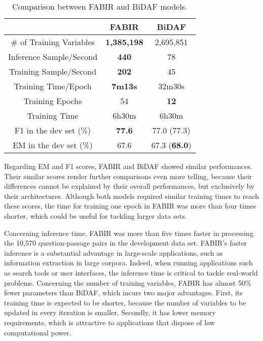 \documentclass[conference, letterpaper, 10pt]{IEEEtran}
\newcommand\Tstrut{\rule{0pt}{2.6ex}}
\begin{document}
\begin{table}[h!]
    \centering
    \caption{Comparison between FABIR and BiDAF \cite{Seo2016} models. }
    \begin{tabular}{| c || c |c|}
        \hline\Tstrut
         & \textbf{FABIR} &\textbf{BiDAF} \\ [0.5ex] 
        \hline
        \hline\Tstrut
         \# of Training Variables & \textbf{1,385,198} & 2,695,851\\
Inference Sample/Second & \textbf{440} & 78 \\
         Training Sample/Second &\textbf{202} & 45 \\
         Training Time/Epoch &\textbf{7m13s} & 32m30s \\
         Training Epochs & 54  & \textbf{12} \\
         Training Time & 6h30m  & 6h30m \\
         F1 in the dev set (\%) & \textbf{77.6} & 77.0 (77.3)\\
         EM in the dev set (\%) & 67.6 &67.3 (\textbf{68.0})\\\hline 
    \end{tabular}
    \label{tab:BidafvsFabir}
\end{table}

Regarding EM and F1 scores, FABIR and BiDAF showed similar performances. 
Their similar scores render further comparisons even more telling, because their differences cannot be explained by their overall performances, but exclusively by their architectures.
Although both models required similar training times to reach these scores, the time for training one epoch in FABIR was more than four times shorter, which could be useful for tackling larger data sets. 

Concerning inference time, FABIR was more than five times faster in processing the 10,570 question-passage pairs in the development data set. 
FABIR's faster inference is a substantial advantage in large-scale applications, such as information extraction in large corpora.
Indeed, when running applications such as search tools or user interfaces, the inference time is critical to tackle real-world problems. 
Concerning the number of training variables, FABIR has almost 50\% fewer parameters than BiDAF, which incurs two major advantages. First, its training time is expected to be shorter, because the number of variables to be updated in every iteration is smaller. Secondly, it has lower memory requirements, which is attractive to applications that dispose of low computational power.
\end{document}
